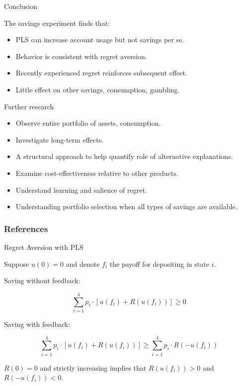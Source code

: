 \documentclass[aspectratio=169]{beamer}
\newenvironment{wideitemize}{\itemize\addtolength{\itemsep}{10pt}}{\enditemize}
\begin{document}
\begin{frame}{Conclusion}

	\begin{wideitemize}
		\item The savings experiment finds that:
		\begin{itemize}
			\item PLS can increase account usage but not savings per se.
			\item Behavior is consistent with regret aversion.
			\item Recently experienced regret reinforces subsequent effect.
			\item Little effect on other savings, consumption, gambling.
		\end{itemize}
		\item Further research
		\begin{itemize}
			\item Observe entire portfolio of assets, consumption.
			\item Investigate long-term effects.
			\item A structural approach to help quantify role of alternative explanations.
			\item Examine cost-effectiveness relative to other products.
			\item Understand learning and salience of regret.
			\item Understanding portfolio selection when all types of savings are available.
		\end{itemize}
	\end{wideitemize}

\end{frame}

\begin{frame}[allowframebreaks] \frametitle{References}

	\printbibliography

\end{frame}

\appendix

\begin{frame}{Regret Aversion with PLS}

	\begin{wideitemize}

		\item Suppose $u(0) = 0$ and denote $f_i$ the payoff for depositing in state $i$. 
	
		\item Saving without feedback:

		\[ \sum_{i=1}^4 p_i \cdot [u(f_i) + R(u(f_i))] \geq 0 \]

		\item Saving with feedback:	

		\[\sum_{i=1}^4 p_i \cdot [u(f_i) + R(u(f_i))] \geq \sum_{i=1}^4 p_i \cdot R(-u(f_i)) \]

		\item $R(0) = 0$ and strictly increasing implies that $R(u(f_i)) > 0$ and $R(-u(f_i)) < 0$.


	\end{wideitemize}

\end{frame}
\end{document}
